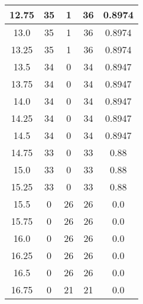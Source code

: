 \documentclass[letterpaper, 12pt]{article}
\begin{document}
\begin{longtable}{|c|c|c|c|c|}
\hline
12.75 & 35 & 1 & 36 & 0.8974 \\
\hline
13.0 & 35 & 1 & 36 & 0.8974 \\
\hline
13.25 & 35 & 1 & 36 & 0.8974 \\
\hline
13.5 & 34 & 0 & 34 & 0.8947 \\
\hline
13.75 & 34 & 0 & 34 & 0.8947 \\
\hline
14.0 & 34 & 0 & 34 & 0.8947 \\
\hline
14.25 & 34 & 0 & 34 & 0.8947 \\
\hline
14.5 & 34 & 0 & 34 & 0.8947 \\
\hline
14.75 & 33 & 0 & 33 & 0.88 \\
\hline
15.0 & 33 & 0 & 33 & 0.88 \\
\hline
15.25 & 33 & 0 & 33 & 0.88 \\
\hline
15.5 & 0 & 26 & 26 & 0.0 \\
\hline
15.75 & 0 & 26 & 26 & 0.0 \\
\hline
16.0 & 0 & 26 & 26 & 0.0 \\
\hline
16.25 & 0 & 26 & 26 & 0.0 \\
\hline
16.5 & 0 & 26 & 26 & 0.0 \\
\hline
16.75 & 0 & 21 & 21 & 0.0 \\
\hline
\end{longtable}
\end{document}
